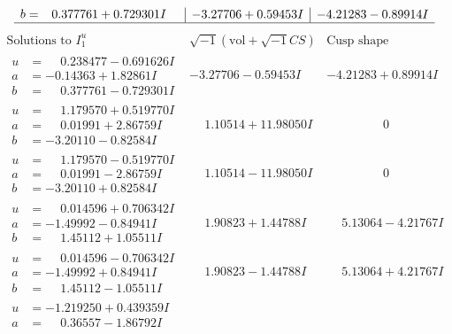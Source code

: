 \documentclass[1p]{elsarticle_modified}
\theoremstyle{definition}
\newcommand{\I}{\sqrt{-1}}
\begin{document}
$$\begin{array}{c|c|c}
\begin{aligned}
b &= \phantom{-}0.377761 + 0.729301 I\end{aligned}
 & -3.27706 + 0.59453 I & -4.21283 - 0.89914 I\\
 \hline 
 \end{array}$$\newpage$$\begin{array}{c|c|c}  
\text{Solutions to }I^u_{1}& \I (\text{vol} + \sqrt{-1}CS) & \text{Cusp shape}\\
 \hline 
\begin{aligned}
u &= \phantom{-}0.238477 - 0.691626 I \\
a &= -0.14363 + 1.82861 I \\
b &= \phantom{-}0.377761 - 0.729301 I\end{aligned}
 & -3.27706 - 0.59453 I & -4.21283 + 0.89914 I \\ \hline\begin{aligned}
u &= \phantom{-}1.179570 + 0.519770 I \\
a &= \phantom{-}0.01991 + 2.86759 I \\
b &= -3.20110 - 0.82584 I\end{aligned}
 & \phantom{-}1.10514 + 11.98050 I & \phantom{-0.000000 } 0 \\ \hline\begin{aligned}
u &= \phantom{-}1.179570 - 0.519770 I \\
a &= \phantom{-}0.01991 - 2.86759 I \\
b &= -3.20110 + 0.82584 I\end{aligned}
 & \phantom{-}1.10514 - 11.98050 I & \phantom{-0.000000 } 0 \\ \hline\begin{aligned}
u &= \phantom{-}0.014596 + 0.706342 I \\
a &= -1.49992 - 0.84941 I \\
b &= \phantom{-}1.45112 + 1.05511 I\end{aligned}
 & \phantom{-}1.90823 + 1.44788 I & \phantom{-}5.13064 - 4.21767 I \\ \hline\begin{aligned}
u &= \phantom{-}0.014596 - 0.706342 I \\
a &= -1.49992 + 0.84941 I \\
b &= \phantom{-}1.45112 - 1.05511 I\end{aligned}
 & \phantom{-}1.90823 - 1.44788 I & \phantom{-}5.13064 + 4.21767 I \\ \hline\begin{aligned}
u &= -1.219250 + 0.439359 I \\
a &= \phantom{-}0.36557 - 1.86792 I \\

\end{aligned}
\end{array}$$
\end{document}
